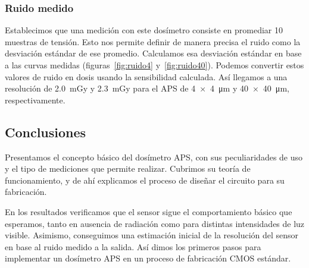 \subsubsection{Ruido medido}
Establecimos que una medición con este dosímetro consiste en promediar 10
muestras de tensión.
Esto nos permite definir de manera precisa el ruido como la desviación estándar
de ese promedio.
Calculamos esa desviación estándar en base a las curvas medidas (figuras~\ref{fig:ruido4} 
y~\ref{fig:ruido40}).
Podemos convertir estos valores de ruido en dosis usando la sensibilidad
calculada.
Así llegamos a una resolución de \SI{2.0}{\milli\gray} y \SI{2.3}{\milli\gray}
para el APS de \SI{4x4}{\micro\meter} y \SI{40x40}{\micro\meter},
    respectivamente.
%
\subsection{Conclusiones}
Presentamos el concepto básico del dosímetro APS,
con sus peculiaridades de uso y el tipo de mediciones que permite realizar.
Cubrimos su teoría de funcionamiento,
y de ahí explicamos el proceso de diseñar el circuito
para su fabricación.

En los resultados verificamos que el sensor
sigue el comportamiento básico que esperamos,
tanto en ausencia de radiación 
como para distintas intensidades de luz visible.
Asimismo, conseguimos una estimación inicial de la resolución del sensor
en base al ruido medido a la salida.
Así dimos los primeros pasos para implementar un dosímetro APS
en un proceso de fabricación CMOS estándar.
